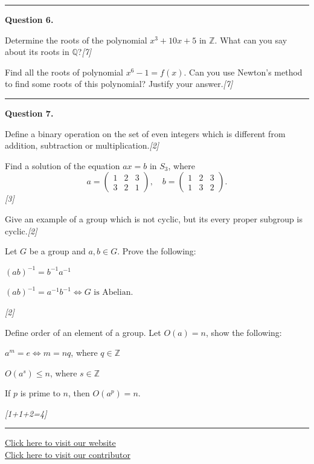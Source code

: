 \documentclass[11pt,a4paper]{article}
\newcommand{\pts}[1]{\hfill\textit{[#1]}}
\begin{document}
\medskip\rule{\linewidth}{0.2pt}\medskip

\noindent\textbf{Question 6.}
\begin{parts}
  \item Determine the roots of the polynomial $x^3 + 10x + 5$ in $\mathbb{Z}$. What can you say about its roots in $\mathbb{Q}$?\pts{7}
  \item Find all the roots of polynomial $x^6 - 1 = f(x)$. Can you use Newton's method to find some roots of this polynomial? Justify your answer.\pts{7}
\end{parts}

\medskip\rule{\linewidth}{0.2pt}\medskip

\noindent\textbf{Question 7.}
\begin{parts}
  \item Define a binary operation on the set of even integers which is different from addition, subtraction or multiplication.\pts{2}
  \item Find a solution of the equation $ax = b$ in $S_3$, where
  \[
    a = \begin{pmatrix} 1 & 2 & 3 \\ 3 & 2 & 1 \end{pmatrix}, \quad b = \begin{pmatrix} 1 & 2 & 3 \\ 1 & 3 & 2 \end{pmatrix}.
  \]\pts{3}
  \item Give an example of a group which is not cyclic, but its every proper subgroup is cyclic.\pts{2}
  \item Let $G$ be a group and $a, b \in G$. Prove the following:
  \begin{parts}
    \item $(ab)^{-1} = b^{-1}a^{-1}$
    \item $(ab)^{-1} = a^{-1}b^{-1} \iff G \text{ is Abelian}$.
  \end{parts}\pts{2}
  \item Define order of an element of a group. Let $O(a) = n$, show the following:
  \begin{parts}
    \item $a^m = e \iff m = nq$, where $q \in \mathbb{Z}$
    \item $O(a^s) \le n$, where $s \in \mathbb{Z}$
    \item If $p$ is prime to $n$, then $O(a^p) = n$.
  \end{parts}\pts{1+1+2=4}
\end{parts}

\vfill
\rule{\linewidth}{0.4pt}
\begin{center}\small
\href{https://bhu-exam.vercel.app/}{Click here to visit our website}\\[4pt]
\href{https://me-aryan.vercel.app/}{Click here to visit our contributor}
\end{center}
\end{document}
